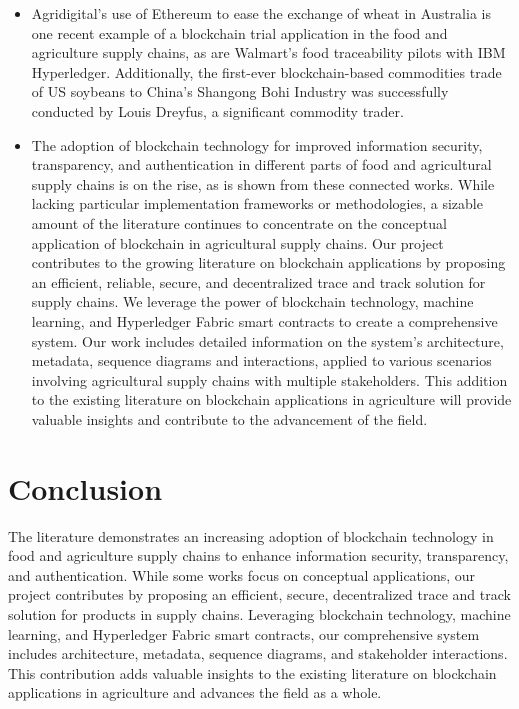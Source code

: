 \begin{itemize}
    \item Agridigital's use of Ethereum to ease the exchange of 
    wheat in Australia is one recent example of a blockchain 
    trial application in the food and agriculture supply 
    chains, as are Walmart's food traceability pilots with 
    IBM Hyperledger. Additionally, the first-ever 
    blockchain-based commodities trade of US soybeans to 
    China's Shangong Bohi Industry was successfully 
    conducted by Louis Dreyfus, a significant commodity 
    trader.
    
    \item The adoption of blockchain technology for improved 
    information security, transparency, and authentication in 
    different parts of food and agricultural supply chains is 
    on the rise, as is shown from these connected works. 
    While lacking particular implementation frameworks or 
    methodologies, a sizable amount of the literature 
    continues to concentrate on the conceptual application of 
    blockchain in agricultural supply chains. 
    Our project contributes to the growing literature on 
    blockchain applications by proposing an efficient, 
    reliable, secure, and decentralized trace and track solution 
    for supply chains. We leverage the power of 
    blockchain technology, machine learning, and 
    Hyperledger Fabric smart contracts to create a 
    comprehensive system. Our work includes detailed 
    information on the system's architecture, metadata, 
    sequence diagrams and interactions, applied to various 
    scenarios involving agricultural supply chains with 
    multiple stakeholders. This addition to the existing 
    literature on blockchain applications in agriculture will 
    provide valuable insights and contribute to the 
    advancement of the field.
  \end{itemize}


\section{Conclusion}
\noindent The literature demonstrates an increasing adoption of blockchain technology in food and agriculture supply chains to enhance information security, transparency, and authentication. While some works focus on conceptual applications, our project contributes by proposing an efficient, secure, decentralized trace and track solution for products in supply chains. Leveraging blockchain technology, machine learning, and Hyperledger Fabric smart contracts, our comprehensive system includes architecture, metadata, sequence diagrams, and stakeholder interactions. This contribution adds valuable insights to the existing literature on blockchain applications in agriculture and advances the field as a whole.